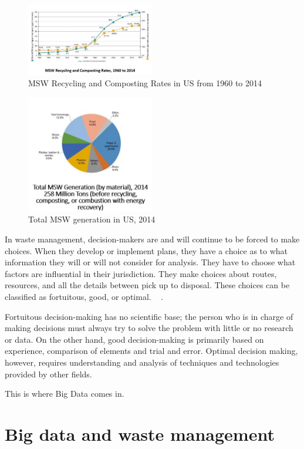 \documentclass[sigconf]{acmart}
\begin{document}
\begin{figure}[ht!]
  \includegraphics[width=0.5\textwidth]{fig3.jpg}
  \caption{MSW Recycling and Composting Rates in US from 1960 to 2014}
\end{figure}

\begin{figure}[ht!]
  \includegraphics[width=0.5\textwidth]{fig4.jpg}
  \caption{Total MSW generation in US, 2014}
\end{figure} 

In waste management, decision-makers are and will continue to be forced to make choices.  When they develop or implement plans, they have a choice as to what information they will or will not consider for analysis.  They have to choose what factors are influential in their jurisdiction.  They make choices about routes, resources, and all the details between pick up to disposal.  These choices can be classified as fortuitous, good, or optimal. ~\cite{akbarpour2016} .

Fortuitous decision-making has no scientific base; the person who is in charge of making decisions must always try to solve the problem with little or no research or data.   On the other hand, good decision-making is primarily based on experience, comparison of elements and trial and error.  Optimal decision making, however, requires understanding and analysis of techniques and technologies provided by other fields.   ~\cite{akbarpour2016} 

This is where Big Data comes in. 

\section{ Big data and waste management}
\end{document}
